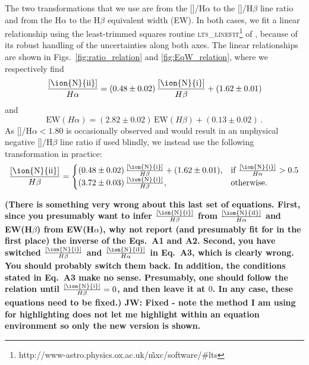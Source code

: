 \documentclass[a4paper,fleqn,usenatbib]{mnras}
\begin{document}
The two transformations that we use are from the
[]/H$\alpha$ to the []/H$\beta$ line ratio and
from the H$\alpha$ to the H$\beta$ equivalent width (EW). In both
cases, we fit a linear relationship using the least-trimmed squares
routine
\textsc{lts\_linefit}\footnote{http://www-astro.physics.ox.ac.uk/\~mxc/software/\#lts}
of \citet{Cappellari2013}, because of its robust handling of the
uncertainties along both axes. The linear relationships are shown in
Figs.~\ref{fig:ratio_relation} and \ref{fig:EqW_relation}, where we
respectively find
\begin{equation}
  \frac{[\text{\ion{N}{ii}}]}{H\alpha}=(0.48\pm0.02)\,\frac{[\text{\ion{N}{i}}]}{H\beta}+(1.62\pm0.01)
\end{equation}
and	
\begin{equation}
  \mathrm{EW}(H\alpha)=(2.82\pm0.02)\,\mathrm{EW}(H\beta)+(0.13\pm0.02)~.
  \label{eq:EqW_dec}
\end{equation}
As []/H$\alpha<1.80$ is occasionally observed and would
result in an unphysical negative []/H$\beta$ line ratio if
used blindly, we instead use the following transformation in practice:
\begin{equation}
  \frac{[\text{\ion{N}{ii}}]}{H\beta}= 
  \begin{cases}
    (0.48\pm0.02)\,\frac{[\text{\ion{N}{i}}]}{H\beta}+(1.62\pm0.01), & \text{if}~\frac{[\text{\ion{N}{i}}]}{H\alpha}>0.5 \\
    (3.72\pm0.03)\,\frac{[\text{\ion{N}{i}}]}{H\beta}, & \text{otherwise.}
  \end{cases}
  \label{eq:N_dec}
\end{equation}

{\bf (There is something very wrong about this last set of
  equations. First, since you presumably want to infer
  $\frac{[\text{\ion{N}{i}}]}{H\beta}$ from
  $\frac{[\text{\ion{N}{iI}}]}{H\alpha}$ and EW(H$\beta$) from
  EW(H$\alpha$), why not report (and presumably fit for in the first
  place) the inverse of the Eqs.~A1 and A2. Second, you have switched
  $\frac{[\text{\ion{N}{i}}]}{H\beta}$ and
  $\frac{[\text{\ion{N}{iI}}]}{H\alpha}$ in Eq.~A3, which is clearly
  wrong. You should probably switch them back. In addition, the
  conditions stated in Eq.~A3 make no sense. Presumably, one should
  follow the relation until $\frac{[\text{\ion{N}{i}}]}{H\beta}=0$,
  and then leave it at $0$. In any case, these equations need to be
  fixed.) JW: Fixed - note the method I am using for highlighting does not let me highlight within an equation environment so only the new version is shown.}
\end{document}
